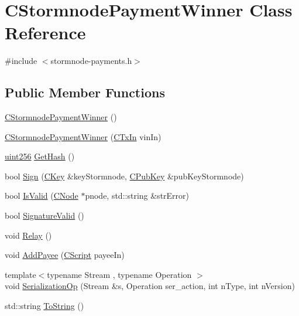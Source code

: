 \hypertarget{class_c_stormnode_payment_winner}{}\section{C\+Stormnode\+Payment\+Winner Class Reference}
\label{class_c_stormnode_payment_winner}


{\ttfamily \#include $<$stormnode-\/payments.\+h$>$}

\subsection*{Public Member Functions}
\begin{DoxyCompactItemize}
\item 
\hyperlink{class_c_stormnode_payment_winner_ae71317a423305ca67c8d97e12bb07f74}{C\+Stormnode\+Payment\+Winner} ()
\item 
\hyperlink{class_c_stormnode_payment_winner_ada5f637e455e6afe3d6a6fdfef424cfa}{C\+Stormnode\+Payment\+Winner} (\hyperlink{class_c_tx_in}{C\+Tx\+In} vin\+In)
\item 
\hyperlink{classuint256}{uint256} \hyperlink{class_c_stormnode_payment_winner_a7ef2cef7bb1dfcd12d7fe7abb15c5802}{Get\+Hash} ()
\item 
bool \hyperlink{class_c_stormnode_payment_winner_a2ee621a52030230a8e3307886f5f45be}{Sign} (\hyperlink{class_c_key}{C\+Key} \&key\+Stormnode, \hyperlink{class_c_pub_key}{C\+Pub\+Key} \&pub\+Key\+Stormnode)
\item 
bool \hyperlink{class_c_stormnode_payment_winner_ae8e5cecfd1f95eed8fdd14f019360fa0}{Is\+Valid} (\hyperlink{class_c_node}{C\+Node} $\ast$pnode, std\+::string \&str\+Error)
\item 
bool \hyperlink{class_c_stormnode_payment_winner_a7c86a0fbc7e6fb5f6e07a0248ed04a43}{Signature\+Valid} ()
\item 
void \hyperlink{class_c_stormnode_payment_winner_a39a19ceedef26c1b54d44853450a71eb}{Relay} ()
\item 
void \hyperlink{class_c_stormnode_payment_winner_ac1b332eb97519047fa170e53af4287e3}{Add\+Payee} (\hyperlink{class_c_script}{C\+Script} payee\+In)
\item 
{\footnotesize template$<$typename Stream , typename Operation $>$ }\\void \hyperlink{class_c_stormnode_payment_winner_a049f6ab099e6521be3a670523d7ac6fd}{Serialization\+Op} (Stream \&s, Operation ser\+\_\+action, int n\+Type, int n\+Version)
\item 
std\+::string \hyperlink{class_c_stormnode_payment_winner_a8e1f36dc03395e3b0468ca51acdd790d}{To\+String} ()
\end{DoxyCompactItemize}
